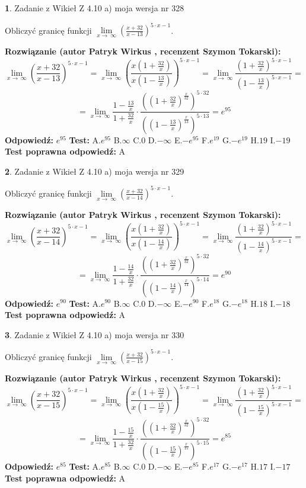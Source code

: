 \documentclass[12pt, a4paper]{article}
\theoremstyle{definition} %
\newtheorem{zad}{}
\newcommand{\zadStart}[1]{\begin{zad}#1\newline}
\newcommand{\zadStop}{\end{zad}}
\newcommand{\rozwStart}[2]{\noindent \textbf{Rozwiązanie (autor #1 , recenzent #2): }\newline}
\newcommand{\rozwStop}{\newline}
\newcommand{\odpStart}{\noindent \textbf{Odpowiedź:}\newline}
\newcommand{\odpStop}{\newline}
\newcommand{\testStart}{\noindent \textbf{Test:}\newline}
\newcommand{\testStop}{\newline}
\newcommand{\kluczStart}{\noindent \textbf{Test poprawna odpowiedź:}\newline}
\newcommand{\kluczStop}{\newline}
\begin{document}
\zadStart{Zadanie z Wikieł Z 4.10 a) moja wersja nr 328}

Obliczyć granicę funkcji  $\lim\limits_{x\to\ \infty}(\frac{x+32}{x-13})^{5\cdot x-1}$.
\zadStop
\rozwStart{Patryk Wirkus}{Szymon Tokarski}
$$\lim\limits_{x\to\ \infty}(\frac{x+32}{x-13})^{5\cdot x-1} = \lim\limits_{x\to\ \infty}(\frac{x(1+\frac{32}{x})}{x(1-\frac{13}{x})})^{5\cdot x-1}=\lim\limits_{x\to\ \infty}\frac{(1+\frac{32}{x})^{5\cdot x-1}}{(1-\frac{13}{x})^{5\cdot x-1}}=$$
$$=\lim\limits_{x\to\ \infty}\frac{1-\frac{13}{x}}{1+\frac{32}{x}}\cdot\frac{((1+\frac{32}{x})^{\frac{x}{32}})^{5\cdot32}}{((1-\frac{13}{x})^{\frac{x}{13}})^{5\cdot13}}=e^{95}$$
\rozwStop
\odpStart
$e^{95}$
\odpStop
\testStart
A.$e^{95}$ B.$\infty$ C.$0$ D.$-\infty$ E.$-e^{95}$
F.$e^{19}$ G.$-e^{19}$
H.$19$
I.$-19$
\testStop
\kluczStart
A
\kluczStop



\zadStart{Zadanie z Wikieł Z 4.10 a) moja wersja nr 329}

Obliczyć granicę funkcji  $\lim\limits_{x\to\ \infty}(\frac{x+32}{x-14})^{5\cdot x-1}$.
\zadStop
\rozwStart{Patryk Wirkus}{Szymon Tokarski}
$$\lim\limits_{x\to\ \infty}(\frac{x+32}{x-14})^{5\cdot x-1} = \lim\limits_{x\to\ \infty}(\frac{x(1+\frac{32}{x})}{x(1-\frac{14}{x})})^{5\cdot x-1}=\lim\limits_{x\to\ \infty}\frac{(1+\frac{32}{x})^{5\cdot x-1}}{(1-\frac{14}{x})^{5\cdot x-1}}=$$
$$=\lim\limits_{x\to\ \infty}\frac{1-\frac{14}{x}}{1+\frac{32}{x}}\cdot\frac{((1+\frac{32}{x})^{\frac{x}{32}})^{5\cdot32}}{((1-\frac{14}{x})^{\frac{x}{14}})^{5\cdot14}}=e^{90}$$
\rozwStop
\odpStart
$e^{90}$
\odpStop
\testStart
A.$e^{90}$ B.$\infty$ C.$0$ D.$-\infty$ E.$-e^{90}$
F.$e^{18}$ G.$-e^{18}$
H.$18$
I.$-18$
\testStop
\kluczStart
A
\kluczStop



\zadStart{Zadanie z Wikieł Z 4.10 a) moja wersja nr 330}

Obliczyć granicę funkcji  $\lim\limits_{x\to\ \infty}(\frac{x+32}{x-15})^{5\cdot x-1}$.
\zadStop
\rozwStart{Patryk Wirkus}{Szymon Tokarski}
$$\lim\limits_{x\to\ \infty}(\frac{x+32}{x-15})^{5\cdot x-1} = \lim\limits_{x\to\ \infty}(\frac{x(1+\frac{32}{x})}{x(1-\frac{15}{x})})^{5\cdot x-1}=\lim\limits_{x\to\ \infty}\frac{(1+\frac{32}{x})^{5\cdot x-1}}{(1-\frac{15}{x})^{5\cdot x-1}}=$$
$$=\lim\limits_{x\to\ \infty}\frac{1-\frac{15}{x}}{1+\frac{32}{x}}\cdot\frac{((1+\frac{32}{x})^{\frac{x}{32}})^{5\cdot32}}{((1-\frac{15}{x})^{\frac{x}{15}})^{5\cdot15}}=e^{85}$$
\rozwStop
\odpStart
$e^{85}$
\odpStop
\testStart
A.$e^{85}$ B.$\infty$ C.$0$ D.$-\infty$ E.$-e^{85}$
F.$e^{17}$ G.$-e^{17}$
H.$17$
I.$-17$
\testStop
\kluczStart
A
\kluczStop
\end{document}
